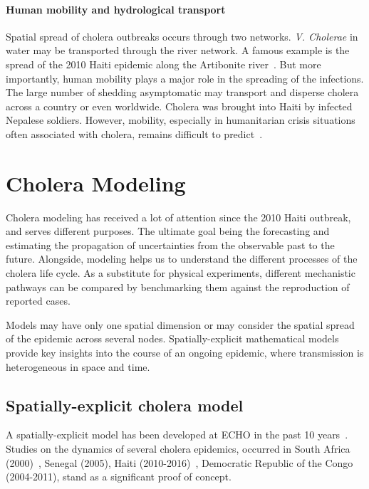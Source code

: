 \paragraph{Human mobility and hydrological transport} Spatial spread of cholera outbreaks occurs through two networks. \textit{V. Cholerae} in water may be transported through the river network. A famous example is the spread of the 2010 Haiti epidemic along the Artibonite river~\cite{gaudart_spatio-temporal_2013}. But more importantly, human mobility plays a major role in the spreading of the infections. The large number of shedding asymptomatic may transport and disperse cholera across a country or even worldwide.  Cholera was brought into Haiti by infected Nepalese soldiers. However, mobility, especially in humanitarian crisis situations often associated with cholera, remains difficult to predict~\cite{lu_predictability_2012, riley_large-scale_2007, bengtsson_improved_2011, rebaudet_dry_2013}.

\section{Cholera Modeling}
Cholera modeling has received a lot of attention since the 2010 Haiti outbreak, and serves different purposes. The ultimate goal being  the forecasting and estimating the propagation of uncertainties from the observable past to the future. Alongside, modeling helps us to understand the different processes of the cholera life cycle. As a substitute for physical experiments, different mechanistic pathways can be compared by benchmarking them against the reproduction of reported cases. %

Models may have only one spatial dimension or may consider the spatial spread of the epidemic across several nodes. Spatially-explicit mathematical models provide key insights into the course of an ongoing epidemic, where transmission is heterogeneous in space and time.

\subsection{Spatially-explicit cholera model}
A spatially-explicit model has been developed at ECHO in the past 10 years~\cite{bertuzzo_space-time_2008}. Studies on the dynamics of several cholera epidemics, occurred in South Africa (2000)~\cite{mari_modelling_2012}, Senegal (2005), Haiti (2010-2016)~\cite{bertuzzo_prediction_2011}, Democratic Republic of the Congo  (2004-2011), stand as a significant proof of concept.  %

